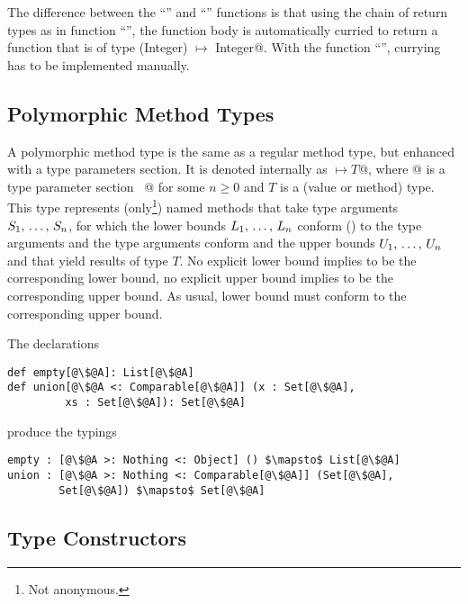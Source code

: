 The difference between the ``'' and ``'' functions is that using the chain of return types as in function ``'', the function body is automatically curried to return a function that is of type \lstinline@(Integer) $\mapsto$ Integer@. With the function ``'', currying has to be implemented manually. 






\subsection{Polymorphic Method Types}
\label{sec:polymorphic-method-types}

A polymorphic method type is the same as a regular method type, but enhanced with a type parameters section. It is denoted internally as \lstinline@[$\tps$]$ \mapsto T$@, where \lstinline@[$\tps$]@ is a type parameter section ~\lstinline@[$\pm a_1$ >: $L_1$ <: $U_1$ $\commadots$ $\pm a_n$ >: $L_n$ <: $U_n$]@ for some $n \geq 0$ and $T$ is a (value or method) type. This type represents (only\footnote{Not anonymous.}) named methods that take type arguments $S_1 ,\, \ldots ,\, S_n$, for which the lower bounds $L_1 ,\, \ldots ,\, L_n$ conform () to the type arguments and the type arguments conform and the upper bounds $U_1 ,\, \ldots ,\, U_n$ and that yield results of type $T$. No explicit lower bound implies  to be the corresponding lower bound, no explicit upper bound implies  to be the corresponding upper bound. As usual, lower bound must conform to the corresponding upper bound. 

\example The declarations
\begin{lstlisting}[escapechar=@,deletekeywords={union}]
def empty[@\$@A]: List[@\$@A]
def union[@\$@A <: Comparable[@\$@A]] (x : Set[@\$@A], 
         xs : Set[@\$@A]): Set[@\$@A]
\end{lstlisting}
produce the typings
\begin{lstlisting}[escapechar=@,deletekeywords={union}]
empty : [@\$@A >: Nothing <: Object] () $\mapsto$ List[@\$@A]
union : [@\$@A >: Nothing <: Comparable[@\$@A]] (Set[@\$@A], 
        Set[@\$@A]) $\mapsto$ Set[@\$@A]
\end{lstlisting}






\subsection{Type Constructors}
\label{sec:type-constructors}

